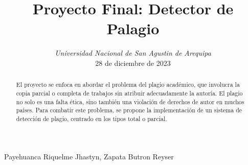 \documentclass[a4paper]{article}
\title{\textbf\textrm\Large{Proyecto Final: Detector de Palagio}}
\date{
\textit{Universidad Nacional de San Agustin de Arequipa}\\
28 de diciembre de 2023}
\begin{document}
\pagestyle{fancy}
\maketitle\centering
Payehuanca Riquelme Jhastyn, Zapata Butron Reyser


\begin{abstract}
El proyecto se enfoca en abordar el problema del plagio académico, que involucra la copia parcial o completa de trabajos sin atribuir adecuadamente la autoría. El plagio no solo es una falta ética, sino también una violación de derechos de autor en muchos países. Para combatir este problema, se propone la implementación de un sistema de detección de plagio, centrado en los tipos total o parcial.



\end{abstract}
\end{document}
